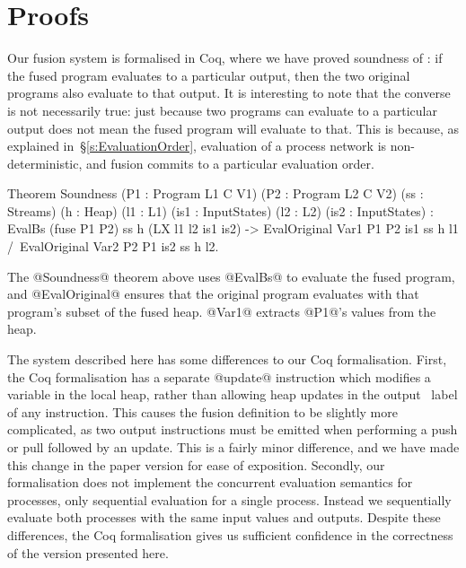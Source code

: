 
\section{Proofs}
\label{s:Proofs}

Our fusion system is formalised in Coq, where we have proved soundness of : if the fused program evaluates to a particular output, then the two original programs also evaluate to that output.
It is interesting to note that the converse is not necessarily true: just because two programs can evaluate to a particular output does not mean the fused program will evaluate to that.
This is because, as explained in~\S\ref{s:EvaluationOrder}, evaluation of a process network is non-deterministic, and fusion commits to a particular evaluation order.

\begin{code}
Theorem Soundness (P1 : Program L1 C V1) (P2 : Program L2 C V2) (ss : Streams) (h : Heap)
    (l1 : L1) (is1 : InputStates) (l2 : L2) (is2 : InputStates) :
  EvalBs (fuse P1 P2) ss h (LX l1 l2 is1 is2)
  -> EvalOriginal Var1 P1 P2 is1 ss h l1 /\ EvalOriginal Var2 P2 P1 is2 ss h l2.
\end{code}

The @Soundness@ theorem above uses @EvalBs@ to evaluate the fused program, and @EvalOriginal@ ensures that the original program evaluates with that program's subset of the fused heap.
@Var1@ extracts @P1@'s values from the heap.

The system described here has some differences to our Coq formalisation.
First, the Coq formalisation has a separate @update@ instruction which modifies a variable in the local heap, rather than allowing heap updates in the output \Next~label of any instruction.
This causes the fusion definition to be slightly more complicated, as two output instructions must be emitted when performing a push or pull followed by an update.
This is a fairly minor difference, and we have made this change in the paper version for ease of exposition.
Secondly, our formalisation does not implement the concurrent evaluation semantics for processes, only sequential evaluation for a single process.
Instead we sequentially evaluate both processes with the same input values and outputs.
Despite these differences, the Coq formalisation gives us sufficient confidence in the correctness of the version presented here.

